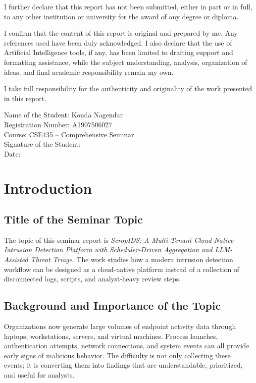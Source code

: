 \documentclass[12pt,a4paper]{report}
\begin{document}
I further declare that this report has not been submitted, either in part or in full, to any other institution or university for the award of any degree or diploma.

I confirm that the content of this report is original and prepared by me. Any references used have been duly acknowledged. I also declare that the use of Artificial Intelligence tools, if any, has been limited to drafting support and formatting assistance, while the subject understanding, analysis, organization of ideas, and final academic responsibility remain my own.

I take full responsibility for the authenticity and originality of the work presented in this report.

\vspace{1.5cm}
Name of the Student: Konda Nagendar\\[0.5cm]
Registration Number: A1907506027\\[0.5cm]
Course: CSE435 -- Comprehensive Seminar\\[0.5cm]
Signature of the Student: \hrulefill\\[0.5cm]
Date: \hrulefill

\clearpage
{}
\setcounter{page}{1}
\tableofcontents
\clearpage

\chapter{Introduction}

\section{Title of the Seminar Topic}
The topic of this seminar report is \textit{ScropIDS: A Multi-Tenant Cloud-Native Intrusion Detection Platform with Scheduler-Driven Aggregation and LLM-Assisted Threat Triage}. The work studies how a modern intrusion detection workflow can be designed as a cloud-native platform instead of a collection of disconnected logs, scripts, and analyst-heavy review steps.

\section{Background and Importance of the Topic}
Organizations now generate large volumes of endpoint activity data through laptops, workstations, servers, and virtual machines. Process launches, authentication attempts, network connections, and system events can all provide early signs of malicious behavior. The difficulty is not only collecting these events; it is converting them into findings that are understandable, prioritized, and useful for analysts.
\end{document}
